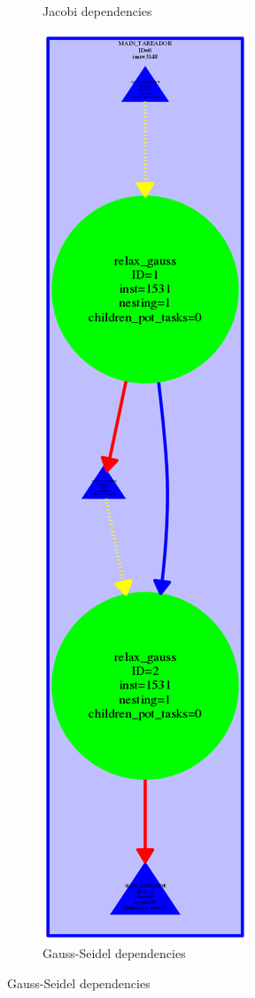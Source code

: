 \documentclass[12]{article}
\begin{document}
\begin{figure}[H]
\begin{subfigure}{.5\textwidth}
    \caption{Jacobi dependencies}
\end{subfigure}
\begin{subfigure}{.5\textwidth}
    \centering
    \includegraphics[scale=0.30]{images/gauss.png}
    \caption{Gauss-Seidel dependencies}
\end{subfigure}
\end{figure}
\end{document}
